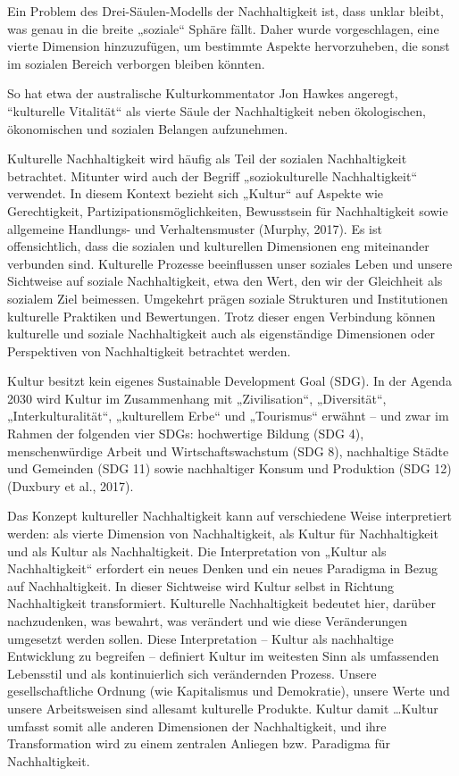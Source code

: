 \documentclass[
  letterpaper,
  DIV=11,
  numbers=noendperiod]{scrartcl}
\begin{document}
Ein Problem des Drei-Säulen-Modells der Nachhaltigkeit ist, dass unklar
bleibt, was genau in die breite „soziale`` Sphäre fällt. Daher wurde
vorgeschlagen, eine vierte Dimension hinzuzufügen, um bestimmte Aspekte
hervorzuheben, die sonst im sozialen Bereich verborgen bleiben könnten.

So hat etwa der australische Kulturkommentator Jon Hawkes angeregt,
``kulturelle Vitalität`` als vierte Säule der Nachhaltigkeit neben
ökologischen, ökonomischen und sozialen Belangen aufzunehmen.

Kulturelle Nachhaltigkeit wird häufig als Teil der sozialen
Nachhaltigkeit betrachtet. Mitunter wird auch der Begriff
„soziokulturelle Nachhaltigkeit`` verwendet. In diesem Kontext bezieht
sich „Kultur`` auf Aspekte wie Gerechtigkeit,
Partizipationsmöglichkeiten, Bewusstsein für Nachhaltigkeit sowie
allgemeine Handlungs- und Verhaltensmuster (Murphy, 2017). Es ist
offensichtlich, dass die sozialen und kulturellen Dimensionen eng
miteinander verbunden sind. Kulturelle Prozesse beeinflussen unser
soziales Leben und unsere Sichtweise auf soziale Nachhaltigkeit, etwa
den Wert, den wir der Gleichheit als sozialem Ziel beimessen. Umgekehrt
prägen soziale Strukturen und Institutionen kulturelle Praktiken und
Bewertungen. Trotz dieser engen Verbindung können kulturelle und soziale
Nachhaltigkeit auch als eigenständige Dimensionen oder Perspektiven von
Nachhaltigkeit betrachtet werden.

Kultur besitzt kein eigenes Sustainable Development Goal (SDG). In der
Agenda 2030 wird Kultur im Zusammenhang mit „Zivilisation``,
„Diversität``, „Interkulturalität``, „kulturellem Erbe`` und
„Tourismus`` erwähnt -- und zwar im Rahmen der folgenden vier SDGs:
hochwertige Bildung (SDG 4), menschenwürdige Arbeit und
Wirtschaftswachstum (SDG 8), nachhaltige Städte und Gemeinden (SDG 11)
sowie nachhaltiger Konsum und Produktion (SDG 12) (Duxbury et al.,
2017).

Das Konzept kultureller Nachhaltigkeit kann auf verschiedene Weise
interpretiert werden: als vierte Dimension von Nachhaltigkeit, als
Kultur für Nachhaltigkeit und als Kultur als Nachhaltigkeit. Die
Interpretation von „Kultur als Nachhaltigkeit`` erfordert ein neues
Denken und ein neues Paradigma in Bezug auf Nachhaltigkeit. In dieser
Sichtweise wird Kultur selbst in Richtung Nachhaltigkeit transformiert.
Kulturelle Nachhaltigkeit bedeutet hier, darüber nachzudenken, was
bewahrt, was verändert und wie diese Veränderungen umgesetzt werden
sollen. Diese Interpretation -- Kultur als nachhaltige Entwicklung zu
begreifen -- definiert Kultur im weitesten Sinn als umfassenden
Lebensstil und als kontinuierlich sich verändernden Prozess. Unsere
gesellschaftliche Ordnung (wie Kapitalismus und Demokratie), unsere
Werte und unsere Arbeitsweisen sind allesamt kulturelle Produkte. Kultur
damit \ldots Kultur umfasst somit alle anderen Dimensionen der
Nachhaltigkeit, und ihre Transformation wird zu einem zentralen Anliegen
bzw. Paradigma für Nachhaltigkeit.
\end{document}
